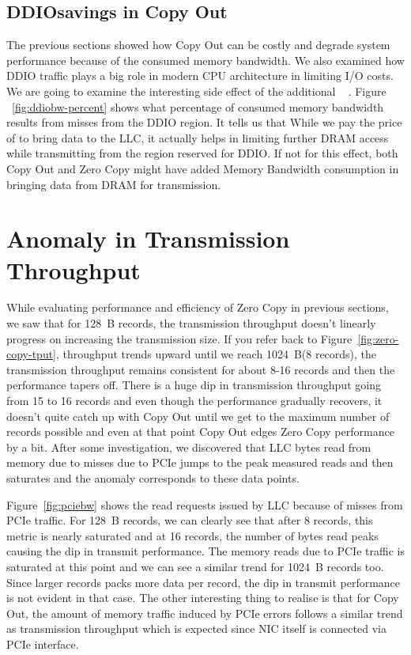 \subsection{DDIO\textregistered savings in Copy Out}
\label{sec:ddiobw-savings}
The previous sections showed how Copy Out can be costly and degrade system performance because of the consumed memory bandwidth. We also examined how DDIO traffic plays a big role 
in modern CPU architecture in limiting I/O costs. We are going to examine the interesting side effect of the additional \memcpy~ . Figure ~\ref{fig:ddiobw-percent} shows what percentage of consumed 
memory bandwidth results from misses from the DDIO region. It tells us that While we pay the price of \memcpy to bring data to the LLC, it actually helps in limiting further DRAM access while transmitting 
from the region reserved for DDIO\textregistered. If not for this effect, both Copy Out and Zero Copy might have added Memory Bandwidth consumption in bringing data from DRAM for transmission. 



\section{Anomaly in Transmission Throughput}
\label{sec:anomaly}
While evaluating performance and efficiency of Zero Copy in previous sections, we saw that for 128~B records, the transmission throughput doesn't linearly progress 
on increasing the transmission size. If you refer back to Figure~\ref{fig:zero-copy-tput}, throughput trends upward until we reach 1024~B(8 records), the transmission throughput remains consistent for about 8-16 records and 
then the performance tapers off. There is a huge dip in transmission throughput going from 15 to 16 records and even though the performance gradually recovers, it doesn't quite 
catch up with Copy Out until we get to the maximum number of records possible and even at that point Copy Out edges Zero Copy performance by a bit. After some investigation, we discovered 
that LLC bytes read from memory due to misses due to PCIe jumps to the peak measured reads and then saturates and the anomaly corresponds to these data points. 

Figure~\ref{fig:pciebw} shows the read requests issued by LLC because of misses from PCIe traffic. For 128~B records, we can clearly see that after 8 records, this metric is 
nearly saturated and at 16 records, the number of bytes read peaks causing the dip in transmit performance. The memory reads due to PCIe traffic is saturated at this point and 
we can see a similar trend for 1024~B records too. Since larger records packs more data per record, the dip in transmit performance is not evident in that case. The other interesting 
thing to realise is that for Copy Out, the amount of memory traffic induced by PCIe errors follows a similar trend as transmission throughput which is expected since 
NIC itself is connected via PCIe interface.


